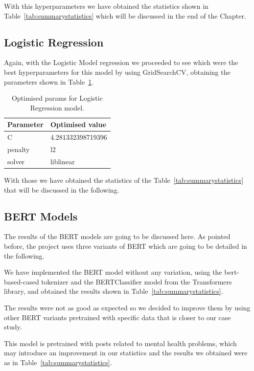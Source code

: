 With this hyperparameters we have obtained the statistics shown in Table~\ref{tab:summarystatistics} which will be discussed in the end of the Chapter.


\subsection{Logistic Regression}
Again, with the Logistic Model regression we proceeded to see which were the best hyperparameters for this model by using GridSearchCV, obtaining the parameters shown in Table~\ref{tab:LRoptimisedparams}.

\begin{table}[]
\centering
\begin{tabular}{|l|l|}
\hline
\textbf{Parameter} & \textbf{Optimised value} \\ \hline
C                  & 4.281332398719396        \\ \hline
penalty            & l2                       \\ \hline
solver             & liblinear                \\ \hline
\end{tabular}
\caption{Optimised params for Logistic Regression model.}
\label{tab:LRoptimisedparams}
\end{table}

With those we have obtained the statistics of the Table~\ref{tab:summarystatistics} that will be discussed in the following.


\subsection{BERT Models}
The results of the BERT models are going to be discussed here. As pointed before, the project uses three variants of BERT which are going to be detailed in the following. 

We have implemented the BERT model without any variation, using the bert-based-cased tokenizer and the BERTClassifier model from the Transformers library, and obtained the results shown in Table~\ref{tab:summarystatistics}.


The results were not as good as expected so we decided to improve them by using other BERT variants pretrained with specific data that is closer to our case study.

This model is pretrained with posts related to mental health problems, which may introduce an improvement in our statistics and the results we obtained were as in Table~\ref{tab:summarystatistics}.

